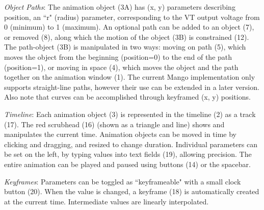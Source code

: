 \emph{Object Paths}: The animation object (3A) has (x, y) parameters describing position, an ``r" (radius) parameter, corresponding to the VT output voltage from 0 (minimum) to 1 (maximum).
An optional path can be added to an object (7), or removed (8), along which the motion of the object (3B) is constrained (12). 
The path-object (3B) %
is manipulated in two ways: moving on path (5), which moves the object from the beginning (position=0) to the end of the path (position=1), or moving in space (4), which moves the object and the path together on the animation window (1).
The current Mango implementation only supports straight-line paths, however their use can be extended in a later version.
Also note that curves can be accomplished through keyframed (x, y) positions.

\emph{Timeline}:  Each animation object (3) is represented in the timeline (2) as a track (17). 
The red scrubhead (16) (shown as a triangle and line) shows and manipulates the current time.
Animation objects can be moved in time by clicking and dragging, and resized to change duration. %
Individual parameters can be set on the left, by typing values into text fields (19), allowing precision.
The entire animation can be played and paused using buttons (14) or the spacebar.

\emph{Keyframes}: Parameters can be toggled as ``keyframeable" with a small clock button (20).
When the value is changed, a keyframe (18) is automatically created at the current time.
Intermediate values are linearly interpolated. %

